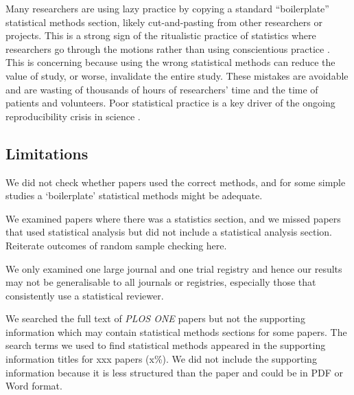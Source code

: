 \documentclass[12pt]{article}
\begin{document}
Many researchers are using lazy practice by copying a standard
``boilerplate'' statistical methods section, likely cut-and-pasting from
other researchers or projects. This is a strong sign of the ritualistic
practice of statistics where researchers go through the motions rather
than using conscientious practice \citep{Stark2018}. This is concerning
because using the wrong statistical methods can reduce the value of
study, or worse, invalidate the entire study. These mistakes are
avoidable and are wasting of thousands of hours of researchers' time and
the time of patients and volunteers. Poor statistical practice is a key
driver of the ongoing reproducibility crisis in science
\citep{Ioannidis2014}.

\hypertarget{limitations}{%
\subsection{Limitations}\label{limitations}}

We did not check whether papers used the correct methods, and for some
simple studies a `boilerplate' statistical methods might be adequate.

We examined papers where there was a statistics section, and we missed
papers that used statistical analysis but did not include a statistical
analysis section. Reiterate outcomes of random sample checking here.

We only examined one large journal and one trial registry and hence our
results may not be generalisable to all journals or registries,
especially those that consistently use a statistical reviewer.

We searched the full text of \emph{PLOS ONE} papers but not the
supporting information which may contain statistical methods sections
for some papers. The search terms we used to find statistical methods
appeared in the supporting information titles for xxx papers (x\%). We
did not include the supporting information because it is less structured
than the paper and could be in PDF or Word format.



\end{document}
